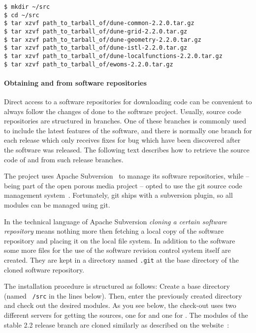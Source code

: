 \begin{lstlisting}[style=Bash]
$ mkdir ~/src
$ cd ~/src
$ tar xzvf path_to_tarball_of/dune-common-2.2.0.tar.gz 
$ tar xzvf path_to_tarball_of/dune-grid-2.2.0.tar.gz 
$ tar xzvf path_to_tarball_of/dune-geometry-2.2.0.tar.gz 
$ tar xzvf path_to_tarball_of/dune-istl-2.2.0.tar.gz 
$ tar xzvf path_to_tarball_of/dune-localfunctions-2.2.0.tar.gz 
$ tar xzvf path_to_tarball_of/ewoms-2.2.0.tar.gz
\end{lstlisting}

\paragraph{Obtaining \Dune and \eWoms from software repositories} 

Direct access to a software repositories for downloading code can be
convenient to always follow the changes of done to the software
project. Usually, source code repositories are structured in
branches. One of these branches is commonly used to include the latest
features of the software, and there is normally one branch for each
release which only receives fixes for bug which have been discovered
after the software was released. The following text describes how to
retrieve the source code of \Dune and \eWoms from such release
branches.

The \Dune project uses Apache Subversion~\cite{APACHE-SUBVERSION-HP}
to manage its software repositories, while \eWoms -- being part of the
open porous media project -- opted to use the git source code
management system~\cite{GIT-HP}. Fortunately, git ships with a
subversion plugin, so all modules can be managed using git.

In the technical language of Apache Subversion \emph{cloning a certain
  software repository} means nothing more then fetching a local copy
of the software repository and placing it on the local file system.
In addition to the software some more files for the use of the
software revision control system itself are created. They are kept in
a directory named \texttt{.git} at the base directory of the cloned
software repository.

The installation procedure is structured as follows: Create a {\Dune} base
directory (named \texttt{~/src} in the lines below).  Then, enter the
previously created directory and check out the desired modules.  As
you see below, the check-out uses two different servers for getting
the sources, one for \Dune and one for \eWoms.  The \Dune modules of
the stable 2.2 release branch are cloned similarly as described on the
\Dune website~\cite{DUNE-DOWNLOAD-SVN}:

